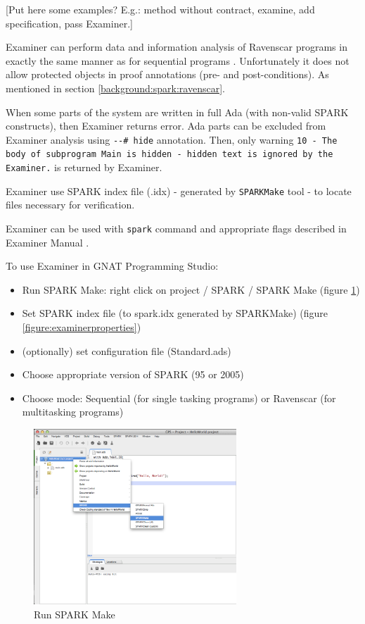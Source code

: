 [Put here some examples? E.g.: method without contract, examine, add specification, pass Examiner.]

Examiner can perform data and information analysis of Ravenscar programs in exactly the same manner as for sequential programs \cite{Ravenscar:Online}. Unfortunately it does not allow protected objects in proof annotations (pre- and post-conditions). As mentioned in section \ref{background:spark:ravenscar}.

When some parts of the system are written in full Ada (with non-valid SPARK constructs), then Examiner returns error. Ada parts can be excluded from Examiner analysis using \lstinline{--# hide} annotation. Then, only warning \lstinline{10 - The body of subprogram Main is hidden - hidden text is ignored by the Examiner.} is returned by Examiner.

Examiner use SPARK index file (.idx) - generated by \lstinline{SPARKMake} tool -  to locate files necessary for verification. \cite{Barnes:Book}

Examiner can be used with \lstinline{spark} command and appropriate flags described in Examiner Manual \cite{Examiner:Online}.


To use Examiner in GNAT Programming Studio:
\begin{itemize}
	\item Run SPARK Make: right click on project / SPARK / SPARK Make (figure \ref{figure:sparkmake})
	\item Set SPARK index file (to spark.idx generated by SPARKMake) (figure \ref{figure:examinerproperties})
	\item (optionally) set configuration file (Standard.ads)
	\item Choose appropriate version of SPARK (95 or 2005)
	\item Choose mode: Sequential (for single tasking programs) or Ravenscar (for multitasking programs)
\end{itemize}

\begin{figure}[ht]%
    \begin{center}
    	\includegraphics[width=3in]{figures/SPARKMake.png}    	
    \end{center}
    \caption{Run SPARK Make}
    \label{figure:sparkmake}
\end{figure}

